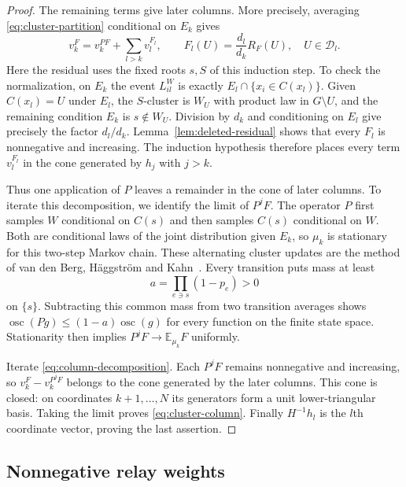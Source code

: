 \documentclass[11pt]{article}
\theoremstyle{definition}
\begin{document}
\begin{proof}
The remaining terms give later columns. More precisely, averaging
\eqref{eq:cluster-partition} conditional on $E_k$ gives
\begin{equation}
\label{eq:column-decomposition}
 v_k^F=v_k^{PF}+\sum_{l>k}v_l^{F_l},\qquad
 F_l(U)=\frac{d_l}{d_k}R_F(U),\quad U\in\mathcal D_l.
\end{equation}
Here the residual uses the fixed roots $s,S$ of this induction step.
To check the normalization, on $E_k$ the event $L_{il}^W$ is exactly
$E_l\cap\{x_i\in C(x_l)\}$.  Given $C(x_l)=U$ under $E_l$, the
$S$-cluster is $W_U$ with product law in $G\setminus U$, and the remaining
condition $E_k$ is $s\notin W_U$.  Division by $d_k$ and conditioning
on $E_l$ give precisely the factor $d_l/d_k$.
Lemma~\ref{lem:deleted-residual} shows that every $F_l$ is nonnegative
and increasing.  The induction hypothesis therefore places every term
$v_l^{F_l}$ in the cone generated by $h_j$ with $j>k$.

Thus one application of $P$ leaves a remainder in the cone of later
columns. To iterate this decomposition, we identify the limit of $P^jF$.
The operator $P$ first samples $W$ conditional on $C(s)$ and then samples
$C(s)$ conditional on $W$. Both are conditional laws of the joint
distribution given $E_k$, so $\mu_k$ is stationary for this two-step
Markov chain. These alternating cluster updates are the method of
van den Berg, H\"aggstr\"om and
Kahn~\cite[Section~2.1]{VanDenBergHaggstromKahn2006}.
Every transition puts mass at least
\[
 a=\prod_{e\ni s}(1-p_e)>0
\]
on $\{s\}$.  Subtracting this common mass from two transition averages
shows $\operatorname{osc}(Pg)\le(1-a)\operatorname{osc}(g)$ for every
function on the finite state space.  Stationarity then implies
$P^jF\to\mathbb E_{\mu_k}F$ uniformly.

Iterate \eqref{eq:column-decomposition}.  Each $P^jF$ remains
nonnegative and increasing, so $v_k^F-v_k^{P^jF}$ belongs to the cone
generated by the later columns.  This cone is closed: on coordinates
$k+1,\ldots,N$ its generators form a unit lower-triangular basis.
Taking the limit proves \eqref{eq:cluster-column}.  Finally
$H^{-1}h_l$ is the $l$th coordinate vector, proving the last assertion.
\end{proof}

\subsection{Nonnegative relay weights}
\end{document}
